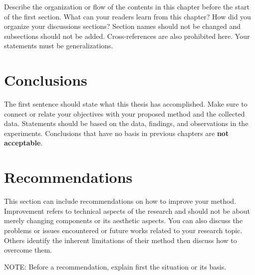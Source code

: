 Describe the organization or flow of the contents in this chapter before the start of the first section.
What can your readers learn from this chapter?
How did you organize your discussions sections?
Section names should not be changed and subsections should not be added.
Cross-references are also prohibited here.
Your statements must be generalizations.

\section{Conclusions}
The first sentence should state what this thesis has accomplished.
Make sure to connect or relate your objectives with your proposed method and the collected data.
Statements should be based on the data, findings, and observations in the experiments.
Conclusions that have no basis in previous chapters are \textbf{not acceptable}.

\section{Recommendations}
This section can include recommendations on how to improve your method.
Improvement refers to technical aspects of the research and should not be about merely changing components or its aesthetic aspects.
You can also discuss the problems or issues encountered or future works related to your research topic. 
Others identify the inherent limitations of their method then discuss how to overcome them. 

NOTE: Before a recommendation, explain first the situation or its basis.